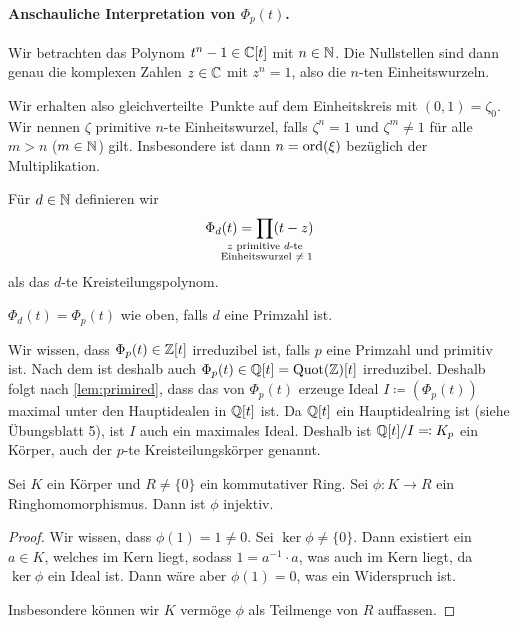 \documentclass[12pt,a4paper]{scrartcl}
\begin{document}
\paragraph{Anschauliche Interpretation von $\Phi_p(t)$.} Wir betrachten das Polynom $t^n-1 \in \mathbb C[t]$ mit $n \in \mathbb N$. Die Nullstellen sind dann genau die komplexen Zahlen $z \in \mathbb C$ mit $z^n = 1$, also die $n$-ten Einheitswurzeln. 


Wir erhalten also \glqq gleichverteilte\grqq\ Punkte auf dem Einheitskreis mit $(0,1) = \zeta_0$. Wir nennen $\zeta$ primitive $n$-te Einheitswurzel, falls $\zeta^n = 1$ und $\zeta^m \neq 1$ für alle $m > n$ ($m \in \mathbb N$) gilt. Insbesondere ist dann $n = \operatorname{ord} (\xi)$ bezüglich der Multiplikation.

\begin{defi}
	Für $d \in \mathbb N$ definieren wir 
	\begin{equation*}
		\Phi_d(t) = \prod_{\mathclap{\substack{\text{$z$ primitive $d$-te}\\\text{ Einheitswurzel $\neq 1$}}}} (t - z)
	\end{equation*}
	als das $d$-te Kreisteilungspolynom.
\end{defi}

\begin{bem}
	$\Phi_d(t) = \Phi_p(t)$ wie oben, falls $d$ eine Primzahl ist. 
\end{bem}

Wir wissen, dass $\Phi_p(t) \in \mathbb Z[t]$ irreduzibel ist, falls $p$ eine Primzahl und primitiv ist. Nach dem  ist deshalb auch $\Phi_p(t) \in \mathbb Q[t] = \operatorname{Quot}(\mathbb Z)[t]$ irreduzibel. Deshalb folgt nach \cref{lem:primired}, dass das von $\Phi_p(t)$ erzeuge Ideal $I \coloneqq \left( \Phi_p(t)\right) $ maximal unter den Hauptidealen in $\mathbb Q[t]$ ist. Da $\mathbb Q[t]$ ein Hauptidealring ist (siehe Übungsblatt 5), ist $I$ auch ein maximales Ideal. Deshalb ist $\mathbb Q[t] / I \eqqcolon K_p $ ein Körper, auch der $p$-te Kreisteilungskörper genannt.

\begin{lem} \label{lem:koerhomoinj}
	Sei $K$ ein Körper und $R \neq \{0\}$ ein kommutativer Ring. Sei $\phi: K \to R$ ein Ringhomomorphismus. Dann ist $\phi$ injektiv.
\end{lem}

\begin{proof}
	Wir wissen, dass $\phi (1) = 1 \neq 0$. Sei $\ker \phi \neq \{0\}$. Dann existiert ein $a \in K$, welches im Kern liegt, sodass $1 = a^{-1}\cdot a$, was auch im Kern liegt, da $\ker \phi$ ein Ideal ist. Dann wäre aber $\phi(1) = 0$, was ein Widerspruch ist.
	
	Insbesondere können wir $K$ vermöge $\phi$ als Teilmenge von $R$ auffassen.  
\end{proof}
\end{document}
